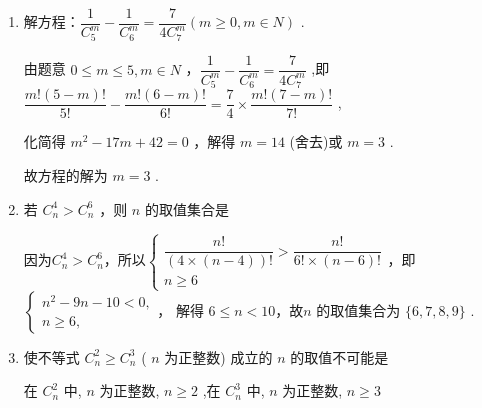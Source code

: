 \begin{enumerate}
\begin{enumerate}
\begin{jieda}
\begin{dingautolist}{172}
                解得 $x = 6$ 或 $x =  - 5$ (舍去),
                
                由于 $\left\{  \begin{matrix} x + 2 > 0 \\  x + 3 > 0 \\  x - 3 \geq  0 \\  x - 2 \geq  0 \end{matrix}\right.$ ,所以 $x \geq  3$ ,故只取 $x = 6,x =  - 5$ 舍去.
            \end{dingautolist}
        \end{jieda}
        \item 解方程：$\dfrac{1}{{{C}}_{5}^{m}} - \dfrac{1}{{{C}}_{6}^{m}} = \dfrac{7}{4{{C}}_{7}^{m}}\left( {m \geq  0,m \in  {N}}\right)$ .
        \begin{jieda}
            由题意 $0 \leq  m \leq  5,m \in  {N}$ ，$\dfrac{1}{{{C}}_{5}^{m}} - \dfrac{1}{{{C}}_{6}^{m}} = \dfrac{7}{4{{C}}_{7}^{m}}$ ,即 $\dfrac{m!\left( {5 - m}\right) !}{5!} - \dfrac{m!\left( {6 - m}\right) !}{6!} = \dfrac{7}{4} \times  \dfrac{m!\left( {7 - m}\right) !}{7!}$ ,
            
            化简得 ${m}^{2} - {17m} + {42} = 0$ ，解得 $m = {14}$ (舍去)或 $m = 3$ .
            
            故方程的解为 $m = 3$ .
            \end{jieda}
        
        \item 若 ${{C}}_{n}^{4} > {{C}}_{n}^{6}$ ，则 $n$ 的取值集合是
        \begin{jieda}
            因为${{C}}_{n}^{4} > {{C}}_{n}^{6}$，所以$\left\{\begin{matrix} \dfrac{n!}{\left( {4 \times  \left( {n - 4}\right) }\right) !} > \dfrac{n!}{6! \times  \left( {n - 6}\right) !} \\  n \geq  6 \end{matrix}\right.$，即 $\left\{  \begin{matrix} {n}^{2} - {9n} - {10} < 0, \\  n \geq  6, \end{matrix}\right.$， 解得 $6 \leq  n < {10}$，故$n$ 的取值集合为 $\{ 6,7,8,9\}$ .
        \end{jieda}
        \item 使不等式 ${{C}}_{n}^{2} \geq  {{C}}_{n}^{3}$ ( $n$ 为正整数) 成立的 $n$ 的取值不可能是
        \begin{jieda}
            在 ${{C}}_{n}^{2}$ 中, $n$ 为正整数, $n \geq  2$ ,在 ${{C}}_{n}^{3}$ 中, $n$ 为正整数, $n \geq  3$
            

\end{jieda}
\end{enumerate}
\end{enumerate}
